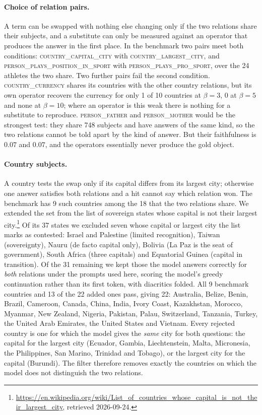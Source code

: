 \documentclass{article}
\begin{document}
\paragraph{Choice of relation pairs.} A term can be swapped with nothing
else changing only if the two relations share their subjects, and a
substitute can only be measured against an operator that produces the
answer in the first place. In the benchmark two pairs meet both
conditions: \textsc{country\_capital\_city} with
\textsc{country\_largest\_city}, and
\textsc{person\_plays\_position\_in\_sport} with
\textsc{person\_plays\_pro\_sport}, over the 24 athletes the two share.
Two further pairs fail the second condition.
\textsc{country\_currency} shares its countries with the other country
relations, but its own operator recovers the currency for only 1 of 10
countries at $\beta = 3$, 0 at $\beta = 5$ and none at $\beta = 10$;
where an operator is this weak there is nothing for a substitute to
reproduce. \textsc{person\_father} and \textsc{person\_mother} would be
the strongest test: they share 748 subjects and have answers of the same
kind, so the two relations cannot be told apart by the kind of answer.
But their faithfulness is $0.07$ and $0.07$, and the operators essentially
never produce the gold object.

\paragraph{Country subjects.} A country tests the swap only if its
capital differs from its largest city; otherwise one answer satisfies
both relations and a hit cannot say which relation won. The benchmark
has 9 such countries among the 18 that the two relations share. We
extended the set from the list of sovereign states whose capital is not
their largest city.\footnote{\url{https://en.wikipedia.org/wiki/List_of_countries_whose_capital_is_not_their_largest_city},
retrieved 2026-09-24.} Of its 37 states we excluded seven whose capital
or largest city the list marks as contested: Israel and Palestine
(limited recognition), Taiwan (sovereignty), Nauru (de facto capital
only), Bolivia (La Paz is the seat of government), South Africa (three
capitals) and Equatorial Guinea (capital in transition). Of the 31
remaining we kept those the model answers correctly for \emph{both}
relations under the prompts used here, scoring the model's greedy
continuation rather than its first token, with diacritics folded. All 9
benchmark countries and 13 of the 22 added ones pass, giving 22:
Australia, Belize, Benin, Brazil, Cameroon, Canada, China, India, Ivory
Coast, Kazakhstan, Morocco, Myanmar, New Zealand, Nigeria, Pakistan,
Palau, Switzerland, Tanzania, Turkey, the United Arab Emirates, the
United States and Vietnam. Every rejected country is one for which the
model gives the \emph{same} city for both questions: the capital for
the largest city (Ecuador, Gambia, Liechtenstein, Malta, Micronesia, the
Philippines, San Marino, Trinidad and Tobago), or the largest city for
the capital (Burundi). The filter therefore removes exactly the countries
on which the model does not distinguish the two relations.
\end{document}
